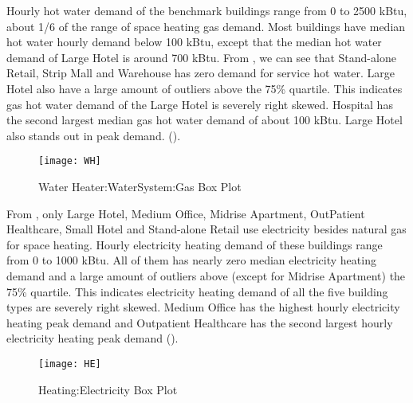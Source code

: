 Hourly hot water demand of the benchmark buildings range from 0 to
2500 kBtu, about 1/6 of the range of space heating gas demand. Most
buildings have median hot water hourly demand below 100 kBtu, except
that the median hot water demand of Large Hotel is around 700
kBtu. From , we can see that Stand-alone Retail,
Strip Mall and Warehouse has zero demand for service hot water. Large
Hotel also have a large amount of outliers above the 75\%
quartile. This indicates gas hot water demand of the Large Hotel is
severely right skewed. Hospital has the second largest median gas hot
water demand of about 100 kBtu. Large Hotel also stands out in peak
demand. ().
\begin{figure}[h!]
  \centering
  \texttt{[image: WH]}
  \caption[Water Heater:WaterSystem:Gas Box Plot]{Water
    Heater:WaterSystem:Gas Box Plot}
  \label{fig:WH}
\end{figure}%

From , only Large Hotel, Medium Office, Midrise
Apartment, OutPatient Healthcare, Small Hotel and Stand-alone Retail
use electricity besides natural gas for space heating. Hourly
electricity heating demand of these buildings range from 0 to 1000
kBtu. All of them has nearly zero median electricity heating demand
and a large amount of outliers above (except for Midrise Apartment)
the 75\% quartile. This indicates electricity heating demand of all
the five building types are severely right skewed. Medium Office has
the highest hourly electricity heating peak demand and Outpatient
Healthcare has the second largest hourly electricity heating peak
demand ().

\begin{figure}[h!]
  \centering
  \texttt{[image: HE]}
  \caption[Heating:Electricity Box Plot]{Heating:Electricity Box Plot}
  \label{fig:HE}
\end{figure}%

